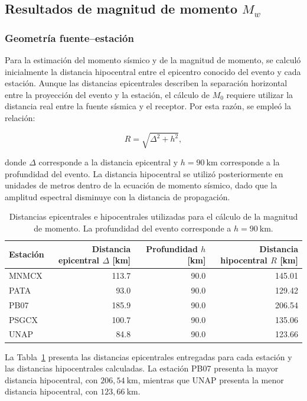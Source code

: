 \documentclass[a4paper,12pt]{article} %
\numberwithin{equation}{section} %
\numberwithin{figure}{section} %
\begin{document}
\clearpage
\subsection{Resultados de magnitud de momento \(M_w\)}

\subsubsection{Geometría fuente--estación}

Para la estimación del momento sísmico y de la magnitud de momento, se calculó inicialmente la distancia hipocentral entre el epicentro conocido del evento y cada estación. Aunque las distancias epicentrales describen la separación horizontal entre la proyección del evento y la estación, el cálculo de \(M_0\) requiere utilizar la distancia real entre la fuente sísmica y el receptor. Por esta razón, se empleó la relación:

\[
R =
\sqrt{\Delta^2+h^2},
\]

donde \(\Delta\) corresponde a la distancia epicentral y \(h=90~\mathrm{km}\) corresponde a la profundidad del evento. La distancia hipocentral se utilizó posteriormente en unidades de metros dentro de la ecuación de momento sísmico, dado que la amplitud espectral disminuye con la distancia de propagación.

\begin{table}[]
    \centering
    \caption{Distancias epicentrales e hipocentrales utilizadas para el cálculo de la magnitud de momento. La profundidad del evento corresponde a \(h=90~\mathrm{km}\).}
    \label{tab:distancias-hipocentrales}
    \begin{tabular}{l r r r}
        \hline
        Estación & Distancia epicentral $\Delta$ [km] &
        Profundidad $h$ [km] &
        Distancia hipocentral $R$ [km] \\
        \hline
        MNMCX & 113.7 & 90.0 & 145.01 \\
        PATA  &  93.0 & 90.0 & 129.42 \\
        PB07  & 185.9 & 90.0 & 206.54 \\
        PSGCX & 100.7 & 90.0 & 135.06 \\
        UNAP  &  84.8 & 90.0 & 123.66 \\
        \hline
    \end{tabular}
\end{table}

La Tabla~\ref{tab:distancias-hipocentrales} presenta las distancias epicentrales entregadas para cada estación y las distancias hipocentrales calculadas. La estación PB07 presenta la mayor distancia hipocentral, con \(206{,}54~\mathrm{km}\), mientras que UNAP presenta la menor distancia hipocentral, con \(123{,}66~\mathrm{km}\).
\end{document}
